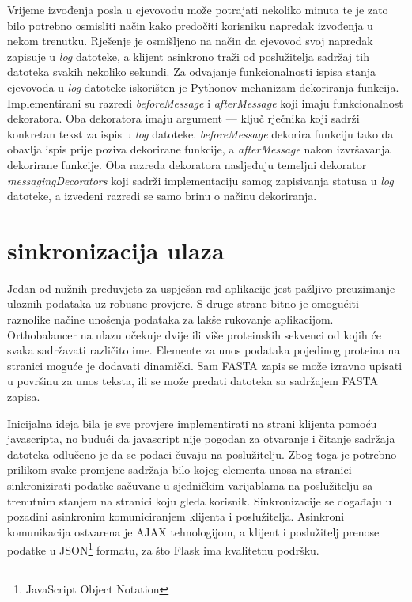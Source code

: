     
Vrijeme izvođenja posla u cjevovodu može potrajati nekoliko minuta te je zato
bilo potrebno osmisliti način kako predočiti korisniku napredak izvođenja u
nekom trenutku. Rješenje je osmišljeno na način da cjevovod svoj napredak
zapisuje u \emph{log} datoteke, a klijent asinkrono traži od poslužitelja
sadržaj tih datoteka svakih nekoliko sekundi. Za odvajanje funkcionalnosti
ispisa stanja cjevovoda u \emph{log} datoteke iskorišten je Pythonov mehanizam
dekoriranja funkcija. Implementirani su razredi \emph{beforeMessage} i
\emph{afterMessage} koji imaju funkcionalnost dekoratora. Oba dekoratora imaju
argument --- ključ rječnika koji sadrži konkretan tekst za ispis u \emph{log}
datoteke. \emph{beforeMessage} dekorira funkciju tako da obavlja ispis prije
poziva dekorirane funkcije, a \emph{afterMessage} nakon izvršavanja dekorirane
funkcije. Oba razreda dekoratora nasljeđuju temeljni dekorator
\emph{messagingDecorators} koji sadrži implementaciju samog zapisivanja statusa
u \emph{log} datoteke, a izvedeni razredi se samo brinu o načinu dekoriranja.



\section{sinkronizacija ulaza}
\label{sec:input}


Jedan od nužnih preduvjeta za uspješan rad aplikacije jest pažljivo preuzimanje
ulaznih podataka uz robusne provjere. S druge strane bitno je omogućiti
raznolike načine unošenja podataka za lakše rukovanje aplikacijom. Orthobalancer
na ulazu očekuje dvije ili više proteinskih sekvenci od kojih će svaka
sadržavati različito ime. Elemente za unos podataka pojedinog proteina na
stranici moguće je dodavati dinamički. Sam FASTA zapis se može izravno upisati u
površinu za unos teksta, ili se može predati datoteka sa sadržajem FASTA zapisa.

Inicijalna ideja bila je sve provjere implementirati na strani klijenta pomoću
javascripta, no budući da javascript nije pogodan za otvaranje i čitanje
sadržaja datoteka odlučeno je da se podaci čuvaju na poslužitelju. Zbog toga je
potrebno prilikom svake promjene sadržaja bilo kojeg elementa unosa na stranici
sinkronizirati podatke sačuvane u sjedničkim varijablama na poslužitelju sa
trenutnim stanjem na stranici koju gleda korisnik. Sinkronizacije se događaju u
pozadini asinkronim komuniciranjem klijenta i poslužitelja. Asinkroni
komunikacija ostvarena je AJAX tehnologijom, a klijent i poslužitelj prenose
podatke u JSON\footnote{JavaScript Object Notation} formatu, za što Flask ima
kvalitetnu podršku.

